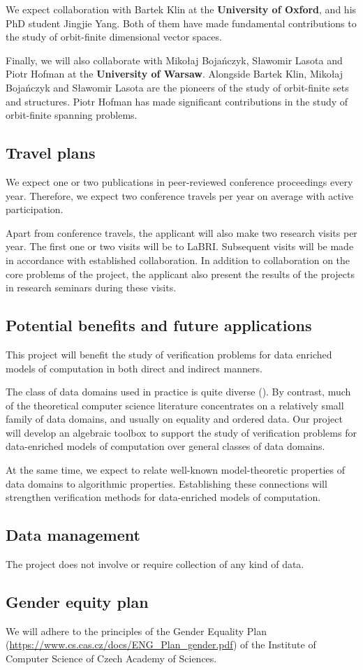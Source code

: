 \documentclass[a4paper,11pt]{article}
\begin{document}
We expect collaboration with Bartek Klin at the \textbf{University of Oxford}, and his PhD student Jingjie Yang.
Both of them have made fundamental contributions to the study of orbit-finite dimensional vector spaces.

Finally, we will also collaborate with Miko\l{}aj Boja\'{n}czyk, S\l{}awomir Lasota and Piotr Hofman at the \textbf{University of Warsaw}.
Alongside Bartek Klin, Miko\l{}aj Boja\'{n}czyk and S\l{}awomir Lasota are the pioneers of the study of orbit-finite sets and structures.
Piotr Hofman has made significant contributions in the study of orbit-finite spanning problems.
%
\subsection{Travel plans}
%
We expect one or two publications in peer-reviewed conference proceedings every year.
Therefore, we expect two conference travels per year on average with active participation.

Apart from conference travels, the applicant will also make two research visits per year.
The first one or two visits will be to LaBRI.
Subsequent visits will be made in accordance with established collaboration.
In addition to collaboration on the core problems of the project,
the applicant also present the results of the projects in research seminars during these visits.

%
\subsection{Potential benefits and future applications}
%
This project will benefit the study of verification problems for data enriched models of computation in both direct and indirect manners.


The class of data domains used in practice is quite diverse (\cite[Section 3.2]{cpnbook}).
By contrast, much of the theoretical computer science literature concentrates on a relatively small family of data domains,
and usually on equality and ordered data.
Our project will develop an algebraic toolbox to support the study of verification problems for data-enriched models of computation over general classes of data domains.

At the same time, we expect to relate well-known model-theoretic properties of data domains to algorithmic properties.
Establishing these connections will strengthen verification methods for data-enriched models of computation.
%
\subsection{Data management}
%
The project does not involve or require collection of any kind of data.
%
\subsection{Gender equity plan}
%
We will adhere to the principles of the Gender Equality Plan (\url{https://www.cs.cas.cz/docs/ENG_Plan_gender.pdf}) of the Institute of Computer Science of Czech Academy of Sciences.
%
\printbibliography
%
\end{document}
